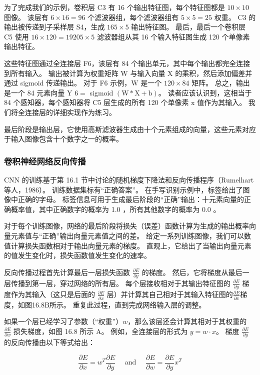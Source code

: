 为了完成我们的示例，卷积层 C3 有 16 个输出特征图，每个特征图都是 $10 × 10$ 图像。 该层有 $6 \times 16=96$ 个滤波器组，每个滤波器组有 $5 \times 5=25$ 权重。 $\mathrm{C} 3$ 的输出被传递到子采样层 S4，生成 $165 \times 5$ 输出特征图。 最后，最后一个卷积层 C5 使用 $16 × 120=19205 \times 5$ 滤波器组从其 16 个输入特征图生成 120 个单像素输出特征。

这些特征图通过全连接层 F6，该层有 84 个输出单元，其中每个输出都完全连接到所有输入。 输出被计算为权重矩阵 $\mathrm{W}$ 与输入向量 $\mathrm{X}$ 的乘积，然后添加偏差并通过 sigmoid 传递输出。 对于 F6 示例，$\mathrm{W}$ 是一个 $120 \times 84$ 矩阵。 总之，输出是一个 84 元素向量 Y $6=$ sigmoid $(\mathrm{W} * \mathrm{X}+\mathrm{b})$。 读者应该认识到，这相当于 84 个感知器，每个感知器将 C5 层生成的所有 120 个单像素 $\mathrm{x}$ 值作为其输入。 我们将全连接层的详细实现作为练习。

最后阶段是输出层，它使用高斯滤波器生成由十个元素组成的向量，这些元素对应于输入图像包含十个数字之一的概率。

\subsubsection{卷积神经网络反向传播}
CNN 的训练基于第 16.1 节中讨论的随机梯度下降法和反向传播程序（Rumelhart 等人，1986）。 训练数据集标有“正确答案”。 在手写识别示例中，标签给出了图像中正确的字母。 标签信息可用于生成最后阶段的“正确”输出：十元素向量的正确概率值，其中正确数字的概率为 1.0 ，所有其他数字的概率为 0.0 。

对于每个训练图像，网络的最后阶段将损失（误差）函数计算为生成的输出概率向量元素值与“正确”输出向量元素值之间的差。 给定一系列训练图像，我们可以数值计算损失函数相对于输出向量元素的梯度。 直观上，它给出了当输出向量元素的值发生变化时，损失函数值发生变化的速率。

反向传播过程首先计算最后一层损失函数 $\frac{\partial E}{\partial y}$ 的梯度。 然后，它将梯度从最后一层传播到第一层，穿过网络的所有层。 每个层接收相对于其输出特征图的 $\frac{\partial E}{\partial y}$ 梯度作为其输入（这只是后面的 $\frac{\partial E}{\partial x}$ 层）并计算其自己相对于其输入特征图的$\frac{\partial E}{\partial x}$梯度，如图16.8B所示。 重复此过程，直到完成网络输入层的调整。

如果一个层已经学习了参数（“权重”）$w$，那么该层还会计算其相对于其权重的 $\frac{\partial E}{\partial w}$ 损失梯度，如图 16.8 所示 A。 例如，全连接层的形式为 $y=w \cdot x$。 梯度 $\frac{\partial E}{\partial y}$ 的反向传播由以下等式给出：

$$
\frac{\partial E}{\partial x}=w^{T} \frac{\partial E}{\partial y} \quad \text { and } \quad \frac{\partial E}{\partial w}=\frac{\partial E}{\partial y} x^{T}
$$

